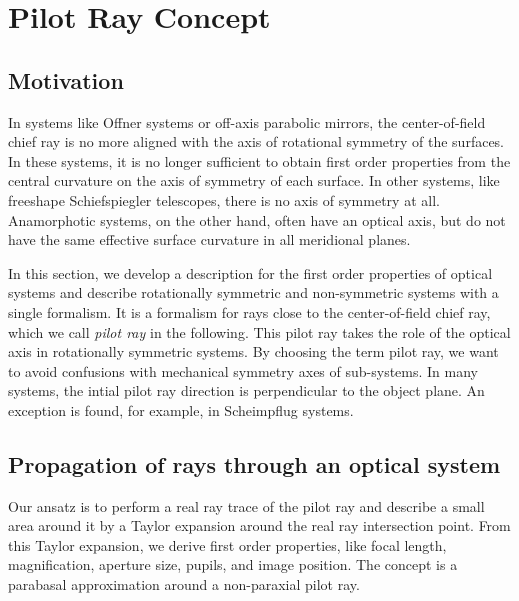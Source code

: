 \documentclass[12pt,a4paper,twoside,openright,BCOR10mm,headsepline,titlepage,abstracton,chapterprefix,final]{scrreprt}
\begin{document}
\section{Pilot Ray Concept}

\subsection{Motivation}

In systems like Offner systems or off-axis parabolic mirrors, the center-of-field chief ray is no more aligned with the axis of rotational symmetry of the surfaces.
In these systems, it is no longer sufficient to obtain first order properties from the central curvature on the axis of symmetry of each surface.
In other systems, like freeshape Schiefspiegler telescopes, there is no axis of symmetry at all. 
Anamorphotic systems, on the other hand, often have an optical axis, but do not have the same effective surface curvature in all meridional planes.

In this section, we develop a description for the first order properties of optical systems 
and describe rotationally symmetric and non-symmetric systems with a single formalism.
It is a formalism for rays close to the center-of-field chief ray, which we call \emph{pilot ray} in the following.
This pilot ray takes the role of the optical axis in rotationally symmetric systems. 
By choosing the term pilot ray, we want to avoid confusions with mechanical symmetry axes of sub-systems.
In many systems, the intial pilot ray direction is perpendicular to the object plane. 
An exception is found, for example, in Scheimpflug systems.



\subsection{Propagation of rays through an optical system}
Our ansatz is to perform a real ray trace of the pilot ray and describe a small area around it by a Taylor expansion around the real ray intersection point.
From this Taylor expansion, we derive first order properties, like focal length, magnification, aperture size, pupils, and image position.
The concept is a parabasal approximation around a non-paraxial pilot ray.
\end{document}
